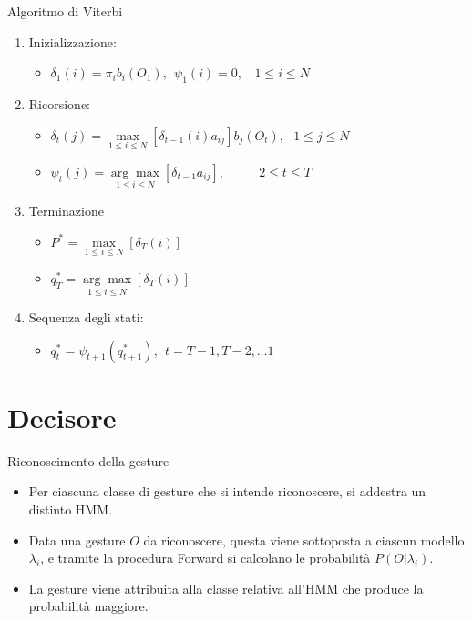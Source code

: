 \documentclass[hyperref={pdfpagelabels=false},slidestop,mathserif,red]{beamer}
\begin{document}
\begin{frame}
\begin{block}{Algoritmo di Viterbi}
\begin{enumerate}
\item Inizializzazione:
	\begin{itemize}
 	\item $\delta_{1}(i)=\pi_{i}b_{i}(O_{1}),\ \ \psi_{1}(i)=0,\ \ \ \ 1\leq i \leq N$  
	\end{itemize}
\item Ricorsione:
	\begin{itemize}
 	\item $\delta_{t}(j)=\underset{1\leq i \leq N}{\max}[\delta_{t-1}(i)a_{ij}]b_{j}(O_{t}),\ \ \ 1\leq j \leq N$
	\item $\psi_{t}(j)=\underset{1\leq i \leq N}{\arg\max}[\delta_{t-1}a_{ij}],\ \ \ \ \ \ \ \ \ \ \ \ 2\leq t \leq T$
	\end{itemize}
\item Terminazione
	\begin{itemize}
 	\item $P^*=\underset{1\leq i \leq N}{\max}[\delta_{T}(i)]$
	\item $q_{T}^*=\underset{1\leq i \leq N}{\arg\max}[\delta_{T}(i)]$
	\end{itemize}
\item Sequenza degli stati:
	\begin{itemize}
 	\item $q_{t}^*=\psi_{t+1}(q_{t+1}^*),\ \ t = T-1,T-2,\ldots1$
	\end{itemize}
\end{enumerate}
\end{block}
\end{frame}

\section{Decisore}

\begin{frame}{Riconoscimento della gesture}
\begin{block}{}
\begin{itemize}
 \item Per ciascuna classe di gesture che si intende riconoscere, si addestra un distinto HMM.
 \item Data una gesture $O$ da riconoscere, questa viene sottoposta a ciascun modello $\lambda_{i}$, e tramite la procedura Forward si calcolano le probabilit\`a $P(O|\lambda_{i})$.
 \item La gesture viene attribuita alla classe relativa all'HMM che produce la probabilit\`a maggiore.
\end{itemize}

\end{block}
\end{frame}
\end{document}
